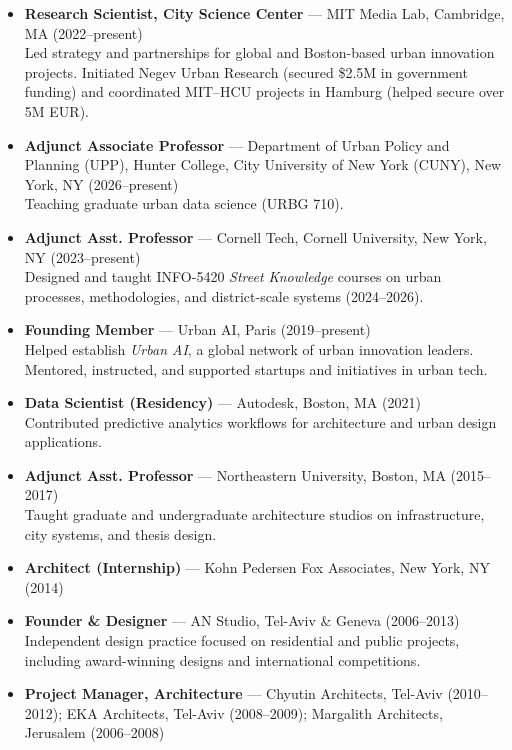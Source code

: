 \documentclass[a4paper,10pt]{article}
\begin{document}
\begin{itemize}[leftmargin=1.2em, itemsep=3pt, topsep=3pt]
      \item \textbf{Research Scientist, City Science Center} --- MIT Media Lab, Cambridge, MA (2022--present) \\
            Led strategy and partnerships for global and Boston-based urban innovation projects. Initiated Negev Urban Research (secured \$2.5M in government funding) and coordinated MIT--HCU projects in Hamburg (helped secure over 5M EUR).

      \item \textbf{Adjunct Associate Professor} --- Department of Urban Policy and Planning (UPP), Hunter College, City University of New York (CUNY), New York, NY (2026--present) \\
            Teaching graduate urban data science (URBG 710).

      \item \textbf{Adjunct Asst. Professor} --- Cornell Tech, Cornell University, New York, NY (2023--present) \\
            Designed and taught INFO-5420 \textit{Street Knowledge} courses on urban processes, methodologies, and district-scale systems (2024--2026).

      \item \textbf{Founding Member} --- Urban AI, Paris (2019--present) \\
            Helped establish \textit{Urban AI}, a global network of urban innovation leaders. Mentored, instructed, and supported startups and initiatives in urban tech.

      \item \textbf{Data Scientist (Residency)} --- Autodesk, Boston, MA (2021) \\
            Contributed predictive analytics workflows for architecture and urban design applications.

      \item \textbf{Adjunct Asst. Professor} --- Northeastern University, Boston, MA (2015--2017) \\
            Taught graduate and undergraduate architecture studios on infrastructure, city systems, and thesis design.

      \item \textbf{Architect (Internship)} --- Kohn Pedersen Fox Associates, New York, NY (2014)

      \item \textbf{Founder \& Designer} --- AN Studio, Tel-Aviv \& Geneva (2006--2013) \\
            Independent design practice focused on residential and public projects, including award-winning designs and international competitions.

      \item \textbf{Project Manager, Architecture} --- Chyutin Architects, Tel-Aviv (2010--2012); EKA Architects, Tel-Aviv (2008--2009); Margalith Architects, Jerusalem (2006--2008)
\end{itemize}
\end{document}
